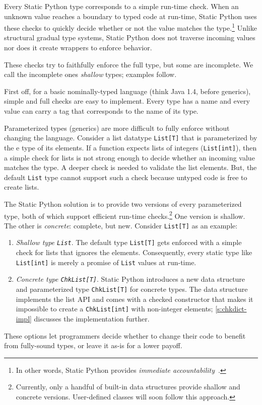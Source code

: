 \documentclass[english,cleveref,submission]{programming}
\newcommand{\SP}{Static Python}
\newcommand{\code}[1]{\texttt{#1}}
\begin{document}
Every \SP{} type corresponds to a simple run-time check.
When an unknown value reaches a boundary to typed code at run-time,
\SP{} uses these checks to quickly decide whether or not the value
matches the type.\footnote{In other words, \SP{} provides \emph{immediate accountability}~\cite{mt-oopsla-2017}.}
Unlike structural gradual type systems, \SP{} does not traverse
incoming values nor does it create wrappers to enforce behavior.

These checks try to faithfully enforce the full type, but some are incomplete.
We call the incomplete ones \emph{shallow} types; examples follow.

First off, for a basic nominally-typed language (think Java 1.4, before
generics), simple and full checks are easy to implement.
Every type has a name and every value can carry a tag that corresponds to the
name of its type.

Parameterized types (generics) are more difficult to fully enforce without
changing the language.
Consider a list datatype \code{List[T]} that is parameterized by the
e type of its elements.
If a function expects lists of integers (\code{List[int]}), then a simple check
for lists is not strong enough to decide whether an incoming value matches the
type.
A deeper check is needed to validate the list elements.
But, the default \code{List} type cannot support such a check because untyped
code is free to create lists.

The \SP{} solution is to provide two versions of every parameterized type,
both of which support efficient run-time checks.\footnote{Currently, only a handful
of built-in data structures provide shallow and concrete versions. User-defined
classes will soon follow this approach.}
One version is shallow.
The other is \emph{concrete}: complete, but new.
Consider \code{List[T]} as an example:
\begin{enumerate}
  \item
    \emph{Shallow type \code{List}}.
    The default type \code{List[T]} gets enforced with a simple check for lists that ignores
    the elements.
    Consequently, every static type like \code{List[int]} is merely a promise of \code{List}
    values at run-time.
  \item
    \emph{Concrete type \code{ChkList[T]}}.
    \SP{} introduces a new data structure and parameterized type \code{ChkList[T]}
    for concrete types.
    The data structure implements the list API and comes with a checked constructor that
    makes it impossible to create a \code{ChkList[int]} with non-integer elements;
    \cref{s:chkdict-impl} discusses the implementation further.
\end{enumerate}
%
These options let programmers decide whether to change their code to benefit from
fully-sound types, or leave it as-is for a lower payoff.
\end{document}
